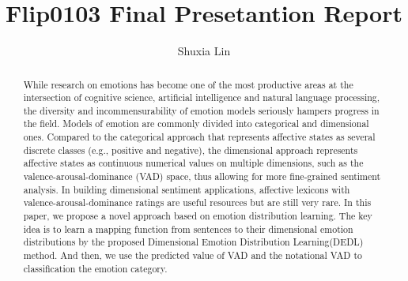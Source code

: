 \documentclass{amsart}
\begin{document}
%
%
\title[Lin's Flip0103]{Flip0103 Final Presetantion Report}%

\author{Shuxia Lin}
\address[A.~1]{School of Computer Science,\\ 
SouthEast University, NanJing 211189, China}%


%
%
\date{\gitAuthorDate}%

\begin{abstract}

While research on emotions has become 
one of the most productive areas at 
the intersection of cognitive science, 
artificial intelligence and natural language processing,
the diversity and incommensurability of 
emotion models seriously hampers progress in the field.
Models of emotion are commonly divided into
categorical and dimensional ones.
Compared to the categorical approach
that represents affective states as 
several discrete classes (e.g., positive and negative),
the dimensional approach represents
affective states as continuous numerical values 
on multiple dimensions,
such as the valence-arousal-dominance (VAD) space,
thus allowing for 
more fine-grained sentiment analysis. 
In building dimensional sentiment applications, 
affective lexicons
with valence-arousal-dominance ratings are 
useful resources but 
are still very rare.
In this paper, 
we propose a novel approach
based on emotion distribution learning.
The key idea is to learn a mapping function
from sentences to their dimensional emotion distributions
by the proposed 
Dimensional Emotion Distribution Learning(DEDL)
method.
And then,
we use the predicted value of VAD and 
the notational VAD to 
classification the emotion category.

\end{abstract}

\maketitle
\tableofcontents

\newpage



\newpage



\end{document}
